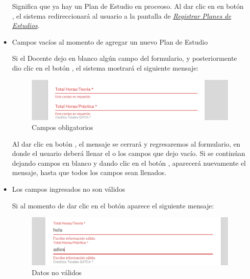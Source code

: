 \begin{itemize}
	
	Significa que ya hay un Plan de Estudio en proceoso. Al dar clic en en botón , el sistema redireccionará al usuario a la pantalla de \hyperlink{registrarPE}{\textit{Registrar Planes de Estudios}}. 
	
	\item Campos vacíos al momento de agregar un nuevo Plan de Estudio
	
	Si el Docente dejo en blanco algún campo del formulario, y posteriormente dio clic en el botón , el sistema mostrará el siguiente mensaje:
		\begin{figure}[!hbtp]
		\centering
		\hypertarget{ms4}{\includegraphics[width=0.7\linewidth]{images/SP4-GPE/m4}}
		\caption{Campos obligatorios}
		\label{ms4}
	    \end{figure}
    
	Al dar clic en botón , el mensaje se cerrará y regresaremos al formulario, en donde el usuario deberá llenar el o los campos que dejo vacío. Si se continúan dejando campos en blanco y dando clic en el botón , aparecerá nuevamente el mensaje, hasta que todos los campos sean llenados.\\
	
	\newpage
	
	\item Los campos ingresados no son válidos
	
	Si al momento de dar clic en el botón  aparece el siguiente mensaje:
	\begin{figure}[!hbtp]
		\centering
		\hypertarget{ms5}{\includegraphics[width=0.7\linewidth]{images/SP4-GPE/m5}}
		\caption{Datos no válidos}
		\label{ms5}
	\end{figure}
	
\end{itemize}
